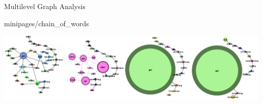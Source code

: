 \documentclass[xcolor=x11names,compress]{beamer}
\begin{document}
{
\begin{frame}[t]{Multilevel Graph Analysis}
    \vspace{-0.2cm}
    
     {minipages/chain_of_words}

    \vspace{-0.5cm}
    \begin{minipage}[t]{\textwidth}
        \centering
    \end{minipage}

    \begin{minipage}[t]{\textwidth}
        \hspace{-0.7cm}
        \includegraphics[width=1.1\textwidth]{immagini/arlie_80_ml}
    \end{minipage}
\end{frame}}
\end{document}
